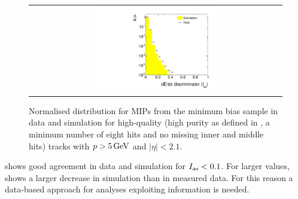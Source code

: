\begin{figure}[!bt]
\vspace{10pt}
  \centering 
  \begin{tabular}{c}
    \includegraphics[width=0.49\textwidth]{figures/analysis/PixelCalibration/htrackASmiSmallRange_log_MIPs.pdf}
  \end{tabular}
  \caption{Normalised \ias distribution for MIPs from the minimum bias sample in data and simulation for high-quality (high purity as defined in \cite{bib:CMS:Tracking_2010}, a minimum number of eight hits and no missing inner and middle hits) tracks with $p>5\,\text{Ge}\kern-0.06667em\text{V}$ and $|\eta|<2.1$.}
  \label{fig:Data-MC-Dedx_MIPs}
\end{figure}
\dedx shows good agreement in data and simulation for $I_{\text{as}}<0.1$.
For larger values, \ias shows a larger decrease in simulation than in measured data.
For this reason a data-based approach for analyses exploiting \dedx information is needed.\\

